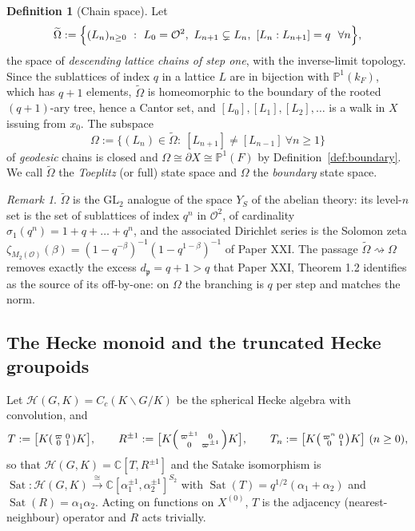 \documentclass[11pt]{amsart}
\numberwithin{equation}{section}
\theoremstyle{definition}
\newtheorem{definition}[theorem]{Definition}
\theoremstyle{remark}
\newtheorem{remark}[theorem]{Remark}
\newcommand{\C}{\mathbb{C}}
\newcommand{\PPone}{\mathbb{P}^1}
\newcommand{\cH}{\mathcal{H}}
\newcommand{\cO}{\mathcal{O}}
\newcommand{\pp}{\mathfrak{p}}
\newcommand{\Sat}{\operatorname{Sat}}
\newcommand{\GL}{\mathrm{GL}}
\begin{document}
\begin{definition}[Chain space]\label{def:chains}
Let
\[
\widetilde\Omega:=\Bigl\{(L_n)_{n\ge0}\ :\ L_0=\cO^2,\ L_{n+1}\subsetneq L_n,\
[L_n:L_{n+1}]=q\ \ \forall n\Bigr\},
\]
the space of \emph{descending lattice chains of step one}, with the inverse-limit
topology. Since the sublattices of index $q$ in a lattice $L$ are in bijection with
$\PPone(k_F)$, which has $q+1$ elements, $\widetilde\Omega$ is homeomorphic to the
boundary of the rooted $(q+1)$-ary tree, hence a Cantor set, and
$[L_0],[L_1],[L_2],\dots$ is a walk in $X$ issuing from $x_0$. The subspace
\[
\Omega:=\{(L_n)\in\widetilde\Omega:\ [L_{n+1}]\neq[L_{n-1}]\ \forall n\ge1\}
\]
of \emph{geodesic} chains is closed and $\Omega\cong\partial X\cong\PPone(F)$ by
Definition~\ref{def:boundary}. We call $\widetilde\Omega$ the \emph{Toeplitz} (or full)
state space and $\Omega$ the \emph{boundary} state space.
\end{definition}

\begin{remark}\label{rem:offbyone}
$\widetilde\Omega$ is the $\GL_2$ analogue of the space $Y_S$ of the abelian theory: its
level-$n$ set is the set of sublattices of index $q^n$ in $\cO^2$, of cardinality
$\sigma_1(q^n)=1+q+\dots+q^n$, and the associated Dirichlet series is the Solomon zeta
$\zeta_{M_2(\cO)}(\beta)=(1-q^{-\beta})^{-1}(1-q^{1-\beta})^{-1}$ of Paper XXI. The
passage $\widetilde\Omega\rightsquigarrow\Omega$ removes exactly the excess
$d_\pp=q+1>q$ that Paper XXI, Theorem 1.2 identifies as the source of its off-by-one:
on $\Omega$ the branching is $q$ per step and matches the norm.
\end{remark}

\subsection{The Hecke monoid and the truncated Hecke groupoids}

Let $\cH(G,K)=C_c(K\backslash G/K)$ be the spherical Hecke algebra with convolution, and
\[
T:=\bigl[K\begin{psmallmatrix}\varpi&0\\0&1\end{psmallmatrix}K\bigr],\qquad
R^{\pm1}:=\bigl[K\begin{psmallmatrix}\varpi^{\pm1}&0\\0&\varpi^{\pm1}\end{psmallmatrix}K\bigr],
\qquad
T_n:=\bigl[K\begin{psmallmatrix}\varpi^{n}&0\\0&1\end{psmallmatrix}K\bigr]\ (n\ge0),
\]
so that $\cH(G,K)=\C[T,R^{\pm1}]$ and the Satake isomorphism is
$\Sat\colon\cH(G,K)\xrightarrow{\cong}\C[\alpha_1^{\pm1},\alpha_2^{\pm1}]^{S_2}$ with
$\Sat(T)=q^{1/2}(\alpha_1+\alpha_2)$ and $\Sat(R)=\alpha_1\alpha_2$. Acting on functions
on $X^{(0)}$, $T$ is the adjacency (nearest-neighbour) operator and $R$ acts trivially.
\end{document}

